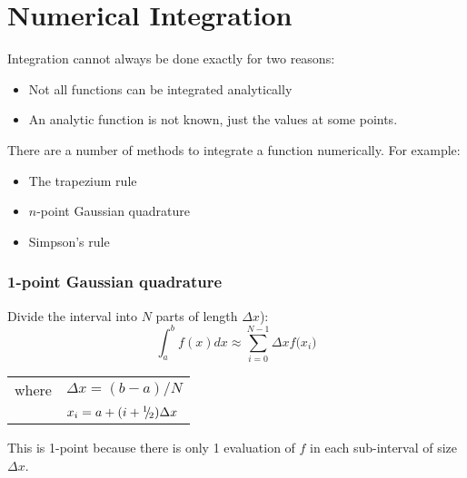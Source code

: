 \chapter{Numerical Integration}

Integration cannot always be done exactly for two reasons:
\begin{itemize}
\item Not all functions can be integrated analytically
\item An analytic function is not known, just the values at some points. 
\end{itemize}
There are a number of methods to integrate a function numerically. For example:
\begin{itemize}
\item The trapezium rule
\item $n$-point Gaussian quadrature
\item Simpson's rule
\end{itemize}

\begin{minipage}{0.49\linewidth}
\subsection{1-point Gaussian quadrature}
Divide the interval into $N$ parts of length $\Delta x$):\\
\[
\int_a^b f(x) dx \approx
\sum_{i=0}^{N-1} \Delta x f\bigl(x_i\bigr)
\]
\begin{tabular}{ll}
where & $\Delta x = (b-a)/N$\\
      & $x_i=a + (i+{^1\negthickspace/\negthinspace_2})\Delta x$\\
\end{tabular}

This is 1-point because there is only 1 evaluation of $f$ in each sub-interval of size $\Delta x$.
\end{minipage}
%
\begin{minipage}{0.49\linewidth}

\end{minipage}

